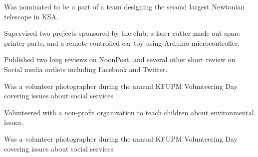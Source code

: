 




Was nominated to be a part of a team designing the second largest  Newtonian telescope in KSA.

\divider

Supervised two projects sponsored by the club; a laser cutter made out spare printer parts, and a remote controlled car toy using Arduino microcontroller.

\divider

Published two long reviews on NoonPost, and several other short review on Social media outlets including Facebook and Twitter.


Was a volunteer photographer during the annual KFUPM Volunteering Day covering issues about social services 

\divider

Volunteered with a non-profit organization to teach children about environmental issues.

\divider

Was a volunteer photographer during the annual KFUPM Volunteering Day covering issues about social services 



%
%
%
%
%


